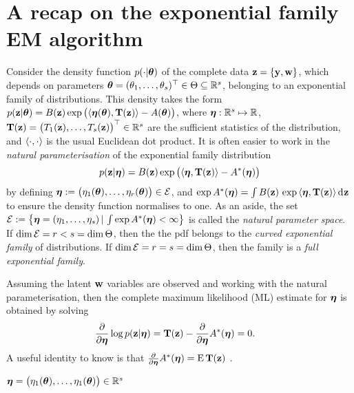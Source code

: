 \section{A recap on the exponential family EM algorithm}
\label{apx:expem}

Consider the density function $p(\cdot|{\bm\theta})$ of the complete data ${\mathbf z} = \{{\mathbf y},{\mathbf w}\}$, which depends on parameters ${\bm\theta} = (\theta_1,\dots,\theta_s)^\top \in\Theta\subseteq\mathbb{R}^s$, belonging to an exponential family of distributions.
This density takes the form $p({\mathbf z}|{\bm\theta}) = B({\mathbf z}) \exp \big( \langle{\bm\eta}({\bm\theta}), {\mathbf T}({\mathbf z})\rangle -  A({\bm\theta}) \big)$, where ${\bm\eta}:\mathbb{R}^s \mapsto \mathbb{R}$,  ${\mathbf T}({\mathbf z}) = \big(T_1({\mathbf z}),\dots,T_s({\mathbf z})\big)^\top \in \mathbb{R}^s$ are the sufficient statistics of the distribution, and $\langle\cdot,\cdot\rangle$ is the usual Euclidean dot product.
It is often easier to work in the \emph{natural parameterisation} of the exponential family distribution
\[
  p({\mathbf z}|{\bm\eta}) = B({\mathbf z}) \exp \big( \langle{\bm\eta}, {\mathbf T}({\mathbf z})\rangle -  A^*({\bm\eta}) \big)
\]
by defining ${\bm\eta} := \big(\eta_1({\bm\theta}),\dots,\eta_r({\bm\theta})\big) \in {\mathcal E}$, and $\exp A^*({\bm\eta}) = \int B({\mathbf z}) \, \exp \, \langle{\bm\eta}, {\mathbf T}({\mathbf z})\rangle  \operatorname{d}\hspace{0.5pt}\! {\mathbf z}$ to ensure the density function normalises to one.
As an aside, the set ${\mathcal E} := \big\{ {\bm\eta} = (\eta_1,\dots,\eta_s) \,|\, \int  \exp A^*({\bm\eta}) < \infty \big\}$ is called the \emph{natural parameter space}.
If $\dim {\mathcal E} = r < s = \dim \Theta$, then the the pdf belongs to the \emph{curved exponential family} of distributions.
If $\dim {\mathcal E} = r = s = \dim \Theta$, then the family is a \emph{full exponential family}.

Assuming the latent ${\mathbf w}$ variables are observed and working with the natural parameterisation, then the complete maximum likelihood (ML) estimate for ${\bm\eta}$ is obtained by solving 
\begin{align*}
  \frac{\partial}{\partial{\bm\eta}}\log p({\mathbf z}|{\bm\eta})
  &= {\mathbf T}({\mathbf z}) - \frac{\partial}{\partial{\bm\eta}} A^*({\bm\eta}) = 0.
\end{align*}
A useful identity to know is that $\frac{\partial}{\partial{\bm\eta}} A^*({\bm\eta}) = \operatorname{E} {\mathbf T}({\mathbf z})$ \citep[Theorem 3.4.2 \& Exercise 3.32(a)]{casella2002statistical}.


${\bm\eta} = \big(\eta_1({\bm\theta}),\dots,\eta_1({\bm\theta})\big)\in\mathbb{R}^s$